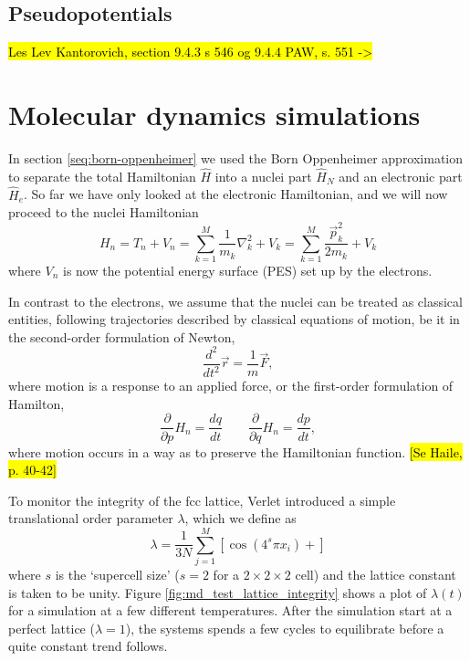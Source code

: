 \documentclass[11pt,bibliography=totoc,index=totoc]{scrbook}   %
\newcommand{\comment}[1]{\hl{#1}}
\begin{document}
\section{Pseudopotentials}

\comment{Les Lev Kantorovich, section 9.4.3 s 546 og 9.4.4 PAW, s. 551 ->}

\chapter{Molecular dynamics simulations}\label{seq:molecular-dynamics}

In section \ref{seq:born-oppenheimer} we used the Born Oppenheimer approximation to separate the total Hamiltonian $\hat{H}$ into a nuclei part $\hat{H}_N$ and an electronic part $\hat{H}_e$. 
So far we have only looked at the electronic Hamiltonian, and we will now proceed to the nuclei Hamiltonian
\begin{equation}
  H_n = T_n + V_n = \sum_{k=1}^M \frac{1}{m_k}\nabla_k^2 + V_k = \sum_{k=1}^M \frac{\vec{p}_k^2}{2m_k} + V_k
  \label{eq:nucleiHamiltonian}
\end{equation}
where $V_n$ is now the potential energy surface (PES) set up by the electrons.

In contrast to the electrons, we assume that the nuclei can be treated as classical entities, following trajectories described by 
classical equations of motion, be it in the
second-order formulation of Newton,
\begin{equation}
  \frac{d^2}{d t^2} \vec{r} = \frac{1}{m}\vec{F},
\end{equation}
where motion is a response to an applied force,
or the first-order formulation of Hamilton,
\begin{equation}
  \frac{\partial}{\partial p} H_n = \frac{dq}{dt} \qquad
  \frac{\partial}{\partial q} H_n = \frac{dp}{dt},
\end{equation}
where motion occurs in a way as to preserve the Hamiltonian function.
\comment{[Se Haile, p. 40-42]}


To monitor the integrity of the fcc lattice, Verlet introduced a simple translational order parameter $\lambda$, which we define as
\begin{equation}
  \lambda = \frac{1}{3N} \sum_{j=1}^M  \left[ \cos\left( 4^s\pi x_i \right) + \right]
\end{equation}
where $s$ is the `supercell size' ($s=2$ for a $2\times 2 \times 2$ cell) and the lattice constant is taken to be unity.
Figure \ref{fig:md_test_lattice_integrity} shows a plot of $\lambda(t)$ for a simulation at a few different temperatures. 
After the simulation start at a perfect lattice ($\lambda=1$), the systems spends a few cycles to equilibrate before a quite constant trend follows.
\end{document}

